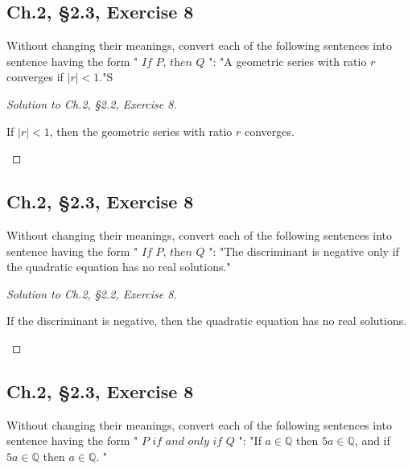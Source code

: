 \documentclass[12pt]{amsart}
\numberwithin{equation}{section}
\theoremstyle{definition}
\theoremstyle{remark}
\begin{document}


\subsection*{Ch.2, \S 2.3,  Exercise 8}  Without changing their meanings, convert each of the following sentences into sentence having the form "$ \textit{ If P, then Q } $": "A geometric series with ratio $ \textit{r} $ converges if $ | \textit{r} | < 1 $."S


\begin{proof}[Solution to Ch.2, \S 2.2,  Exercise 8]
\ 
\\ 

\begin{center}
If $ | \textit{r} | < 1 $, then the geometric series with ratio $ \textit{r} $ converges.
\end{center}

\end{proof}




\subsection*{Ch.2, \S 2.3,  Exercise 8}  Without changing their meanings, convert each of the following sentences into sentence having the form "$ \textit{ If P, then Q } $": "The discriminant is negative only if the quadratic equation has no real solutions."


\begin{proof}[Solution to Ch.2, \S 2.2,  Exercise 8]
\ 
\\ 

\begin{center}
If the discriminant is negative, then the quadratic equation has no real solutions.
\end{center}

\end{proof}




\subsection*{Ch.2, \S 2.3,  Exercise 8}  Without changing their meanings, convert each of the following sentences into sentence having the form "$ \textit{ P if and only if Q } $": "If $ \textit{a} \in \mathbb{Q} $ then $ 5 \textit{a} \in \mathbb{Q} $, and if $ 5 \textit{a} \in \mathbb{Q} $ then $ \textit{a} \in \mathbb{Q} $. "
\end{document}
